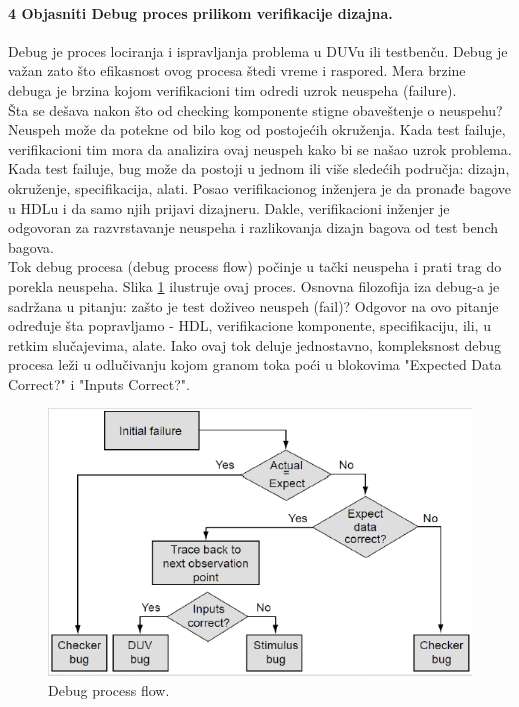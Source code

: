 \documentclass[a4paper, 12pt]{article}
\begin{document}
\paragraph{4 Objasniti Debug proces prilikom verifikacije dizajna.}
\hfill \break
\indent Debug  je proces lociranja i ispravljanja problema u DUVu ili testbenču. Debug je važan zato što efikasnost ovog procesa štedi vreme i raspored. Mera brzine debuga je brzina kojom verifikacioni tim odredi uzrok neuspeha (failure).\\
\indent Šta se dešava nakon što od checking komponente stigne obaveštenje o neuspehu? Neuspeh može da potekne od bilo kog od postojećih okruženja. Kada test failuje, verifikacioni tim mora da analizira ovaj neuspeh kako bi se našao uzrok problema. Kada test failuje, bug može da postoji u jednom ili više sledećih područja: dizajn, okruženje, specifikacija, alati. Posao verifikacionog inženjera je da pronađe bagove u HDLu i da samo njih prijavi dizajneru. Dakle, verifikacioni inženjer je odgovoran za razvrstavanje neuspeha i razlikovanja dizajn bagova od test bench bagova.\\
\indent Tok debug procesa (debug process flow) počinje u tački neuspeha i prati trag do porekla neuspeha. Slika \ref{img4} ilustruje ovaj proces. Osnovna filozofija iza debug-a je sadržana u pitanju: zašto je test doživeo neuspeh (fail)? Odgovor na ovo pitanje određuje šta popravljamo - HDL, verifikacione komponente, specifikaciju, ili, u retkim slučajevima, alate. Iako ovaj tok deluje jednostavno, kompleksnost debug procesa leži u odlučivanju kojom granom toka poći u blokovima "Expected Data Correct?" i "Inputs Correct?".
\begin{figure}[h!]
\centering
\includegraphics[scale=0.8]{img4.png}
\caption{Debug process flow.}
\label{img4}
\end{figure} 
\end{document}
